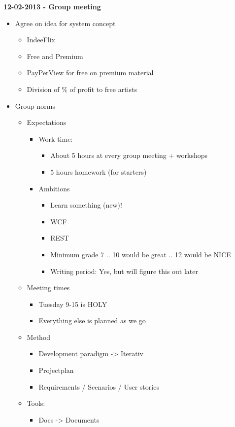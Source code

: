 \documentclass[11pt]{article}
\begin{document}
\begin{landscape}
\begin{multicols}{2}
\textbf{12-02-2013 - Group meeting}
\begin{itemize}
\item Agree on idea for system concept
\begin{itemize}
\item IndeeFlix
\item Free and Premium
\item PayPerView for free on premium material
\item Division of \% of profit to free artists
\end{itemize}
\item Group norms
\begin{itemize}
\item Expectations
\begin{itemize}
\item Work time:
\begin{itemize}
\item About 5 hours at every group meeting + workshops
\item 5 hours homework (for starters)
\end{itemize}
\item Ambitions
\begin{itemize}
\item Learn something (new)!
\item WCF
\item REST
\item Minimum grade 7 .. 10 would be great .. 12 would be NICE
\item Writing period: Yes, but will figure this out later
\end{itemize}
\end{itemize}
\item Meeting times
\begin{itemize}
\item Tuesday 9-15 is HOLY
\item Everything else is planned as we go
\end{itemize}
\item Method
\begin{itemize}
\item Development paradigm -> Iterativ
\item Projectplan
\item Requirements / Scenarios / User stories
\end{itemize}
\item Tools:
\begin{itemize}
\item Docs -> Documents

\end{itemize}
\end{itemize}
\end{itemize}
\end{multicols}
\end{landscape}
\end{document}
